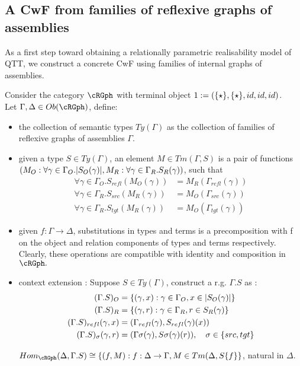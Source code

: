 \documentclass[12pt,a4paper]{article}
\def\src{_{src}}\alwaysmath{src}
\def\rfl{_{refl}}\alwaysmath{rfl}
\def\tgt{_{tgt}}\alwaysmath{tgt}
\renewcommand{\O}{_{O}}
\newcommand{\R}{\ensuremath{_{R}}}
\begin{document}
\subsection*{A CwF from families of reflexive graphs of assemblies}
As a first step toward obtaining a relationally parametric realisability model of QTT, we construct a concrete CwF using families of internal graphs of assemblies.

Consider the category $\cRGph$ with terminal object $1 := (\{\star\}, \{\star\}, id, id, id)$.\\
Let $\Gamma, \Delta \in \ob\cRGph$, define: 
\begin{itemize}[noitemsep]
  \item the collection of semantic types $Ty(\Gamma)$ as the collection of families of reflexive graphs of assemblies $\Gamma$.
  
  \item given a type $S \in Ty(\Gamma)$, an element $M \in Tm(\Gamma, S)$ is a pair of functions $(M\O : \forall \gamma \in \Gamma\O. \carr{S\O(\gamma)}, M\R : \forall \gamma \in \Gamma\R. S\R(\gamma))$, such that 
  \begin{align*}
    \forall \gamma \in \Gamma\O. {S\rfl} (M\O(\gamma)) &= M\R(\Gamma\rfl(\gamma))\\
    \forall \gamma \in \Gamma\R. {S\src} (M\R(\gamma)) &= M\O(\Gamma\src(\gamma))\\
    \forall \gamma \in \Gamma\R. {S\tgt} (M\R(\gamma)) &= M\O(\Gamma\tgt(\gamma))
  \end{align*}
  
  \item given $f : \Gamma \to \Delta$, substitutions in types and terms is a precomposition with f on the object and relation components of types and terms respectively. Clearly, these operations are compatible with identity and composition in $\cRGph.$
  
  \item context extension : Suppose $S \in Ty(\Gamma)$, construct a r.g. $\Gamma.S$ as :
  \begin{align*}
    (\Gamma.S)\O &= \{(\gamma, x) : \gamma \in \Gamma\O, x \in \carr{S\O(\gamma)}\}\\
    (\Gamma.S)\R &= \{(\gamma, r) : \gamma \in \Gamma\R, r \in S\R(\gamma)\}\\
    (\Gamma.S)\rfl(\gamma, x) &= (\Gamma\rfl(\gamma), S\rfl(\gamma)(x))\\
    (\Gamma.S)_\sigma(\gamma, r) &= (\Gamma\sigma(\gamma), S\sigma(\gamma)(r)),\quad \sigma \in \{src, tgt\}
  \end{align*}
  \begin{claim}
    $Hom_{\cRGph}(\Delta, \Gamma.S) \cong \{(f,M): f : \Delta \to \Gamma, M \in Tm(\Delta, S\{f\}\}$, natural in $\Delta$.
  \end{claim}
  

\end{itemize}
\end{document}
